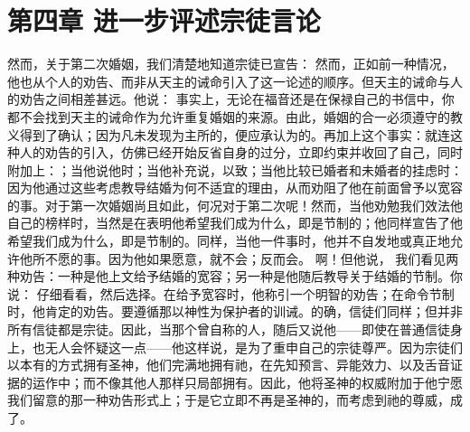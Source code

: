 
\section{第四章 进一步评述宗徒言论}

然而，关于第二次婚姻，我们清楚地知道宗徒已宣告： 然而，正如前一种情况，他也从个人的劝告、而非从天主的诫命引入了这一论述的顺序。但天主的诫命与人的劝告之间相差甚远。他说： 事实上，无论在福音还是在保禄自己的书信中，你都不会找到天主的诫命作为允许重复婚姻的来源。由此，婚姻的合一必须遵守的教义得到了确认；因为凡未发现为主所的，便应承认为的。再加上这个事实：就连这种人的劝告的引入，仿佛已经开始反省自身的过分，立即约束并收回了自己，同时附加上：；当他说他时；当他补充说，以致；当他比较已婚者和未婚者的挂虑时：因为他通过这些考虑教导结婚为何不适宜的理由，从而劝阻了他在前面曾予以宽容的事。对于第一次婚姻尚且如此，何况对于第二次呢！然而，当他劝勉我们效法他自己的榜样时，当然是在表明他希望我们成为什么，即是节制的；他同样宣告了他希望我们成为什么，即是节制的。同样，当他一件事时，他并不自发地或真正地允许他所不愿的事。因为他如果愿意，就不会；反而会。 啊！但他说， 我们看见两种劝告：一种是他上文给予结婚的宽容；另一种是他随后教导关于结婚的节制。你说： 仔细看看，然后选择。在给予宽容时，他称引一个明智的劝告；在命令节制时，他肯定的劝告。要遵循那以神性为保护者的训诫。的确，信徒们同样；但并非所有信徒都是宗徒。因此，当那个曾自称的人，随后又说他——即使在普通信徒身上，也无人会怀疑这一点——他这样说，是为了重申自己的宗徒尊严。因为宗徒们以本有的方式拥有圣神，他们完满地拥有祂，在先知预言、异能效力、以及舌音证据的运作中；而不像其他人那样只局部拥有。因此，他将圣神的权威附加于他宁愿我们留意的那一种劝告形式上；于是它立即不再是圣神的，而考虑到祂的尊威，成了。\par


